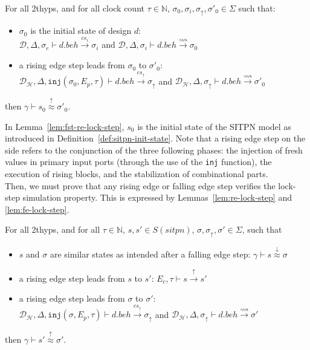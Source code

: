 \begin{lemma}
  \label{lem:fst-re-lock-step}
  For all \hm2thyps{}, and for all clock count $\tau\in\mathbb{N}$,
  $\sigma_0,\sigma_i,\sigma_{\uparrow},\sigma'_0\in{}\Sigma$ such that:
  \begin{itemize}
  \item $\sigma_0$ is the initial state of design $d$:\\
    $\mathcal{D},\Delta,\sigma_e\vdash{}d.beh\xrightarrow{cs_i}{}\sigma_i$ and
    $\mathcal{D},\Delta,\sigma_i\vdash{}d.beh\xrightarrow{\rightsquigarrow}{}\sigma_0$
    
  \item a rising edge step leads from $\sigma_0$ to $\sigma'_0$:\\
    $\mathcal{D}_\mathcal{H},\Delta,\mathtt{inj}(\sigma_0,E_p,\tau)\vdash{}d.beh\xrightarrow{cs_{\uparrow}}\sigma_{\uparrow}$
    and
    $\mathcal{D}_\mathcal{H},\Delta,\sigma_{\uparrow}\vdash{}d.beh\xrightarrow{\rightsquigarrow}\sigma'_0$
  \end{itemize}
  then $\gamma\vdash{}s_0\stackrel{\uparrow}{\approx}\sigma'_0$.
\end{lemma}
In Lemma~\ref{lem:fst-re-lock-step}, $s_0$ is the initial state of the
SITPN model as introduced in
Definition~\ref{def:sitpn-init-state}.  Note that a rising edge step on the \hvhdl{} side refers to the conjunction of the three following phases: the injection of fresh values in primary input ports (through the use of the \texttt{inj} function), the execution of rising blocks, and the stabilization of combinational parts. \\

Then, we must prove that any rising edge or falling edge step verifies
the lock-step simulation property. This is expressed by
Lemmas~\ref{lem:re-lock-step} and \ref{lem:fe-lock-step}. 

\begin{lemma}
  \label{lem:re-lock-step}
  For all \hm2thyps{}, and for all $\tau\in\mathbb{N}$,
  $s,s'\in{}S(sitpn)$, $\sigma,\sigma_\uparrow,\sigma'\in\Sigma$, such
  that
  \begin{itemize}
  \item $s$ and $\sigma$ are similar states as intended after a
    falling edge step:
    $\gamma\vdash{}s\stackrel{\downarrow}{\approx}\sigma$
  \item a rising edge step leads from $s$ to $s'$:
    $E_c,\tau\vdash{}s\xrightarrow{\uparrow}s'$
  \item a rising edge step leads from $\sigma$ to $\sigma'$:\\
    $\mathcal{D}_\mathcal{H},\Delta,\mathtt{inj}(\sigma,E_p,\tau)\vdash{}d.beh\xrightarrow{cs_{\uparrow}}\sigma_{\uparrow}$
    and
    $\mathcal{D}_\mathcal{H},\Delta,\sigma_{\uparrow}\vdash{}d.beh\xrightarrow{\rightsquigarrow}\sigma'$
  \end{itemize}
  then $\gamma\vdash{}s'\stackrel{\uparrow}{\approx}{}\sigma'$.
  
\end{lemma}

